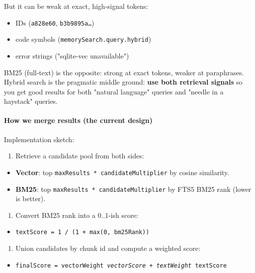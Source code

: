 But it can be weak at exact, high-signal tokens:

\begin{itemize}
  \item IDs (\texttt{a828e60}, \texttt{b3b9895a…})
  \item code symbols (\texttt{memorySearch.query.hybrid})
  \item error strings ("sqlite-vec unavailable")
\end{itemize}


BM25 (full-text) is the opposite: strong at exact tokens, weaker at paraphrases.
Hybrid search is the pragmatic middle ground: \textbf{use both retrieval signals} so you get
good results for both "natural language" queries and "needle in a haystack" queries.

\paragraph{How we merge results (the current design)}


Implementation sketch:

\begin{enumerate}
  \item Retrieve a candidate pool from both sides:
\end{enumerate}


\begin{itemize}
  \item \textbf{Vector}: top \texttt{maxResults * candidateMultiplier} by cosine similarity.
  \item \textbf{BM25}: top \texttt{maxResults * candidateMultiplier} by FTS5 BM25 rank (lower is better).
\end{itemize}


\begin{enumerate}
  \item Convert BM25 rank into a 0..1-ish score:
\end{enumerate}


\begin{itemize}
  \item \texttt{textScore = 1 / (1 + max(0, bm25Rank))}
\end{itemize}


\begin{enumerate}
  \item Union candidates by chunk id and compute a weighted score:
\end{enumerate}


\begin{itemize}
  \item \texttt{finalScore = vectorWeight \textit{ vectorScore + textWeight } textScore}
\end{itemize}


